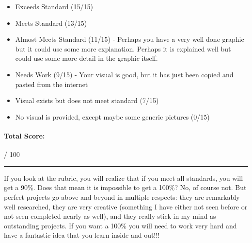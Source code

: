 \documentclass[10pt]{exam}
\begin{document}
\begin{itemize}
  \item Exceeds Standard (15/15)
  \item Meets Standard (13/15)
  \item Almost Meets Standard (11/15) - 
    Perhaps you have a very well done graphic but it could use some more explanation.  Perhaps it is explained well but could use some more detail in the graphic itself.
  \item Needs Work (9/15) -
    Your visual is good, but it has just been copied and pasted from the internet
  \item Visual exists but does not meet standard (7/15)
  \item No visual is provided, except maybe some generic pictures (0/15)
  
\end{itemize}

\paragraph{Total Score:}
  \fillin[][3em] / 100

  \vs \hrule \vs

\noindent \small
If you look at the rubric, you will realize that if you meet all standards, you will get a 90\%.  Does that mean it is impossible to get a 100\%?  No, of course not.  But perfect projects go above and beyond in multiple respects: they are remarkably well researched, they are very creative (something I have either not seen before or not seen completed nearly as well), and they really stick in my mind as outstanding projects.  If you want a 100\% you will need to work very hard and have a fantastic idea that you learn inside and out!!!
\end{document}
